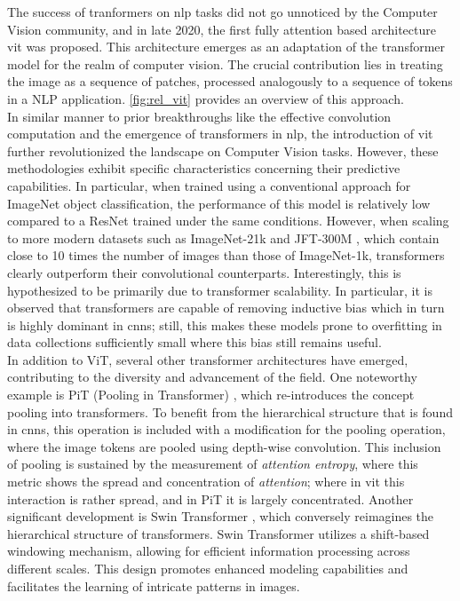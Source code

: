\noindent The success of tranformers on \gls{nlp} tasks did not go unnoticed by the Computer Vision 
community, and in late 2020, the first fully attention based architecture \gls{vit} was proposed.
This architecture emerges as an adaptation of the transformer model for the realm of computer vision. 
The crucial contribution lies in treating the image as a sequence of patches, processed 
analogously to a sequence of tokens in a NLP application. \autoref{fig:rel_vit} provides an 
overview of this approach.\\



\noindent In similar manner to prior breakthroughs like the effective convolution computation and the 
emergence of transformers in \gls{nlp}, the introduction of \gls{vit} further revolutionized the 
landscape on Computer Vision tasks. However, these methodologies exhibit specific characteristics 
concerning their predictive capabilities. In particular, when trained using a conventional 
approach for ImageNet object classification, the performance of this model is relatively low 
compared to a ResNet trained under the same conditions. However, when scaling to more modern 
datasets such as ImageNet-21k and JFT-300M \autocite{sun2017revisiting}, which contain close to 10 
times the number of images than those of ImageNet-1k, transformers clearly outperform their 
convolutional counterparts. Interestingly, this is hypothesized to be primarily due to transformer 
scalability. In particular, it is observed that transformers are capable of removing inductive bias 
which in turn is highly dominant in \glspl{cnn}; still, this makes these models prone to overfitting 
in data collections sufficiently small where this bias still remains useful.\\


In addition to ViT, several other transformer architectures have emerged, contributing to the 
diversity and advancement of the field. One noteworthy example is PiT (Pooling in Transformer) 
\autocite{heo2021rethinking}, which re-introduces the concept pooling into transformers. To benefit 
from the hierarchical structure that is found in \glspl{cnn}, this operation is included with 
a modification for the pooling operation, where the image tokens are  pooled using depth-wise 
convolution. This inclusion of pooling is sustained by the measurement of \emph{attention entropy}, 
where this metric shows the spread and concentration of \emph{attention}; where in \gls{vit} this 
interaction is rather spread, and in PiT it is largely concentrated. Another significant 
development is Swin Transformer \autocite{liu2021swin}, which conversely reimagines the 
hierarchical structure of transformers. 
Swin Transformer utilizes a shift-based windowing mechanism, allowing for efficient information 
processing across different scales. This design promotes enhanced modeling capabilities and 
facilitates the learning of intricate patterns in images.\\

